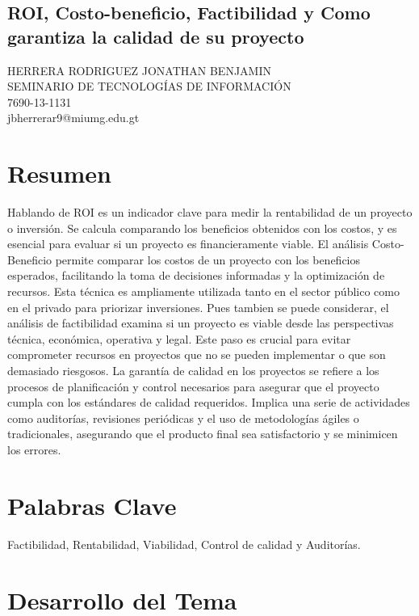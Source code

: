 \documentclass[12pt]{article}
\begin{document}
\begin{center}
\section*{ROI, Costo-beneficio, Factibilidad y Como garantiza la calidad de su proyecto}
HERRERA RODRIGUEZ JONATHAN BENJAMIN
\\SEMINARIO DE TECNOLOGÍAS DE INFORMACIÓN
\\7690-13-1131
\\jbherrerar9@miumg.edu.gt
\end{center}
\section{Resumen}

Hablando de ROI es un indicador clave para medir la rentabilidad de un proyecto o inversión. Se calcula comparando los beneficios obtenidos con los costos, y es esencial para evaluar si un proyecto es financieramente viable. El análisis Costo-Beneficio permite comparar los costos de un proyecto con los beneficios esperados, facilitando la toma de decisiones informadas y la optimización de recursos. Esta técnica es ampliamente utilizada tanto en el sector público como en el privado para priorizar inversiones. Pues tambien se puede considerar, el análisis de factibilidad examina si un proyecto es viable desde las perspectivas técnica, económica, operativa y legal. Este paso es crucial para evitar comprometer recursos en proyectos que no se pueden implementar o que son demasiado riesgosos. La garantía de calidad en los proyectos se refiere a los procesos de planificación y control necesarios para asegurar que el proyecto cumpla con los estándares de calidad requeridos. Implica una serie de actividades como auditorías, revisiones periódicas y el uso de metodologías ágiles o tradicionales, asegurando que el producto final sea satisfactorio y se minimicen los errores.

\section{Palabras Clave}
Factibilidad, Rentabilidad, Viabilidad, Control de calidad y Auditorías.

\section{Desarrollo del Tema}
\end{document}
